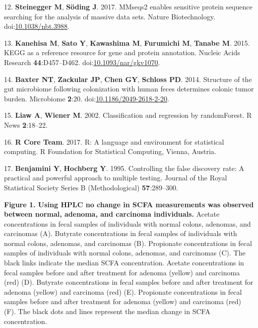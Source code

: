 \documentclass[11pt,]{article}
\begin{document}
\hypertarget{ref-Steinegger2017}{}
12. \textbf{Steinegger M}, \textbf{Söding J}. 2017. MMseqs2 enables
sensitive protein sequence searching for the analysis of massive data
sets. Nature Biotechnology.
doi:\href{https://doi.org/10.1038/nbt.3988}{10.1038/nbt.3988}.

\hypertarget{ref-Kanehisa2015}{}
13. \textbf{Kanehisa M}, \textbf{Sato Y}, \textbf{Kawashima M},
\textbf{Furumichi M}, \textbf{Tanabe M}. 2015. KEGG as a reference
resource for gene and protein annotation. Nucleic Acids Research
\textbf{44}:D457--D462.
doi:\href{https://doi.org/10.1093/nar/gkv1070}{10.1093/nar/gkv1070}.

\hypertarget{ref-scfa_baxter2014}{}
14. \textbf{Baxter NT}, \textbf{Zackular JP}, \textbf{Chen GY},
\textbf{Schloss PD}. 2014. Structure of the gut microbiome following
colonization with human feces determines colonic tumor burden.
Microbiome \textbf{2}:20.
doi:\href{https://doi.org/10.1186/2049-2618-2-20}{10.1186/2049-2618-2-20}.

\hypertarget{ref-randomforest_citation_2002}{}
15. \textbf{Liaw A}, \textbf{Wiener M}. 2002. Classification and
regression by randomForest. R News \textbf{2}:18--22.

\hypertarget{ref-r_citation_2017}{}
16. \textbf{R Core Team}. 2017. R: A language and environment for
statistical computing. R Foundation for Statistical Computing, Vienna,
Austria.

\hypertarget{ref-benjamini_controlling_1995}{}
17. \textbf{Benjamini Y}, \textbf{Hochberg Y}. 1995. Controlling the
false discovery rate: A practical and powerful approach to multiple
testing. Journal of the Royal Statistical Society Series B
(Methodological) \textbf{57}:289--300.

\newpage

\textbf{Figure 1. Using HPLC no change in SCFA measurements was observed
between normal, adenoma, and carcinoma individuals.} Acetate
concentrations in fecal samples of individuals with normal colons,
adenomas, and carcinomas (A). Butyrate concentrations in fecal samples
of individuals with normal colons, adenomas, and carcinomas (B).
Propionate concentrations in fecal samples of individuals with normal
colons, adenomas, and carcinomas (C). The black links indicate the
median SCFA concentration. Acetate concentrations in fecal samples
before and after treatment for adenoma (yellow) and carcinoma (red) (D).
Butyrate concentrations in fecal samples before and after treatment for
adenoma (yellow) and carcinoma (red) (E). Propionate concentrations in
fecal samples before and after treatment for adenoma (yellow) and
carcinoma (red) (F). The black dots and lines represent the median
change in SCFA concentration.
\end{document}
